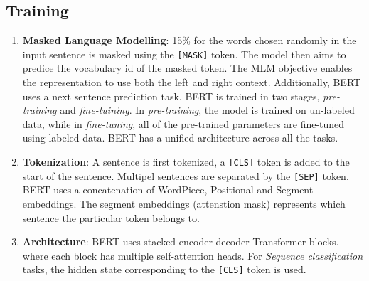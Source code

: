 \documentclass[12pt]{article}
\begin{document}
\subsection*{Training}
\begin{enumerate}
    \item \textbf{Masked Language Modelling}: 15\% for the words chosen randomly in the input sentence is masked using the \texttt{[MASK]} token. The model then aims to predice the vocabulary id of the masked token. The MLM objective enables the representation to use both the left and right context. Additionally, BERT uses a next sentence prediction task. BERT is trained in two stages, \textit{pre-training} and \textit{fine-tuining}. In \textit{pre-training}, the model is trained on un-labeled data, while in \textit{fine-tuning}, all of the pre-trained parameters are fine-tuned using labeled data. BERT has a unified architecture across all the tasks.
    \item \textbf{Tokenization}: A sentence is first tokenized, a \texttt{[CLS]} token is added to the start of the sentence. Multipel sentences are separated by the \texttt{[SEP]} token. BERT uses a concatenation of WordPiece, Positional and Segment embeddings. The segment embeddings (attenstion mask) represents which sentence the particular token belongs to.
    \item \textbf{Architecture}: BERT uses stacked encoder-decoder Transformer blocks. where each block has multiple self-attention heads. For \textit{Sequence classification} tasks, the hidden state corresponding to the \texttt{[CLS]} token is used.
\end{enumerate}
\end{document}
